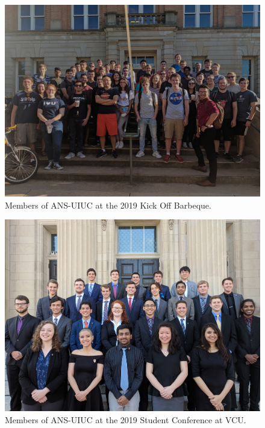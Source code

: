 \documentclass[12pt, letterpaper]{article}
\begin{document}
\begin{figure}[H]
  \centering
  \includegraphics[width=12cm]{ans_uiuc_group.jpg}
  \caption{Members of ANS-UIUC at the 2019 Kick Off Barbeque.}
\end{figure}

\begin{figure}[H]
  \centering
  \includegraphics[width=12cm]{ans_conf_19.jpg}
  \caption{Members of ANS-UIUC at the 2019 Student Conference at VCU.}
\end{figure}
\end{document}
